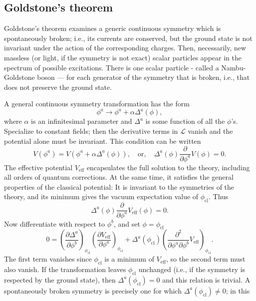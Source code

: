 \subsection{Goldstone's theorem}
\begin{newthem}
Goldstone's theorem examines a generic continuous symmetry which is spontaneously broken; i.e., its currents are conserved, but the ground state is not invariant under the action of the corresponding charges. Then, necessarily, new massless (or light, if the symmetry is not exact) scalar particles appear in the spectrum of possible excitations. There is one scalar particle - called a Nambu-Goldstone boson — for each generator of the symmetry that is broken, i.e., that does not preserve the ground state.
\end{newthem}
\begin{newproof}
A general continuous symmetry transformation has the form
\[\phi^a \to \phi^a + \alpha \Delta^a (\phi),\]
where $\alpha$ is an infinitesimal parameter and $\Delta^a$ is some function of all the $\phi$'s. Specialize to constant fields; then the derivative terms in $\mathcal{L}$ vanish and the potential alone must be invariant. This condition can be written
\[V(\phi^a) = V(\phi^a + \alpha \Delta^a (\phi)) , \quad \mbox{or} , \quad \Delta^a(\phi) \frac{\partial}{\partial \phi^a} V(\phi) = 0.\]
The effective potential $V_{\mathrm{eff}}$ encapsulates the full solution to the theory, including all orders of quantum corrections. At the same time, it satisfies the general properties of the classical potential: It is invariant to the symmetries of the theory, and its minimum gives the vacuum expectation value of $\phi_{\mathrm{cl}}$. Thus
\[\Delta^a(\phi) \frac{\partial}{\partial \phi^a} V_{\mathrm{eff}}(\phi) = 0.\]
Now differentiate with respect to $\phi^b$, and set $\phi = \phi_{\mathrm{cl}}$
\[0 = \left( \frac{\partial \Delta^a}{\partial \phi^b} \right)_{\phi_{\mathrm{cl}}} \left( \frac{\partial V_{\mathrm{eff}}}{\partial \phi^a}\right)_{\phi_{\mathrm{cl}}} + \Delta^a(\phi_{\mathrm{cl}}) \left( \frac{\partial^2}{\partial \phi^a \partial \phi^b}V_{\mathrm{eff}}\right)_{\phi_{\mathrm{cl}}}.\]
The first term vanishes since $\phi_{\mathrm{cl}}$ is a minimum of $V_{\mathrm{eff}}$, so the second term must also vanish. If the transformation leaves $\phi_{\mathrm{cl}}$ unchanged (i.e., if the symmetry is respected by the ground state), then $\Delta^a(\phi_{\mathrm{cl}})=0$ and this relation is trivial. A spontaneously broken symmetry is precisely one for which $\Delta^a(\phi_{\mathrm{cl}}) \neq 0$; in this

\end{newproof}
